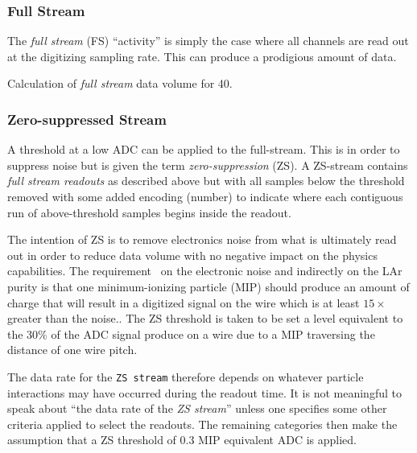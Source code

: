 \subsubsection{Full Stream}

The \textit{full stream} (FS) ``activity'' is simply the case where
all channels are read out at the digitizing sampling rate.
This can produce a prodigious amount of data.


\begin{table}[htbp]
  \centering
  \caption{Calculation of \textit{full stream} data volume for
    \SI{40}{\kton}.}
%  
  \label{tab:full-stream}
\end{table}

\subsubsection{Zero-suppressed Stream}

A threshold at a low ADC can be applied to the full-stream.
This is in order to suppress noise but is given the term
\textit{zero-suppression} (ZS).
A ZS-stream contains \textit{full stream readouts} as described above
but with all samples below the threshold removed with some added
encoding (number) to indicate where each contiguous run of
above-threshold samples begins inside the readout.

The intention of ZS is to remove electronics noise from what is
ultimately read out in order to reduce data volume with no negative
impact on the physics capabilities.
The requirement~\cite{docdb3383} on the electronic noise and
indirectly on the LAr purity is that one minimum-ionizing particle
(MIP) should produce an amount of charge that will result in a
digitized signal on the wire which is at least $15\times$ greater than
the noise..
The ZS threshold is taken to be set a level equivalent to the 30\% of
the ADC signal produce on a wire due to a MIP traversing the distance
of one wire pitch.

The data rate for the \texttt{ZS stream} therefore depends on whatever
particle interactions may have occurred during the readout time.
It is not meaningful to speak about ``the data rate of the \textit{ZS
  stream}'' unless one specifies some other criteria applied to select
the readouts.
The remaining categories then make the assumption that a ZS threshold
of \num{0.3} MIP equivalent ADC is applied.

